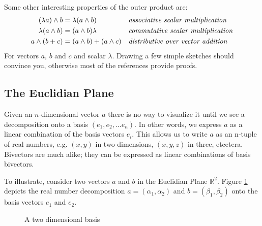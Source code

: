 \documentclass[10pt]{report}
\begin{document}
Some other interesting properties of the outer product are:
\begin{align}
(\lambda a)\wedge b &= \lambda(a\wedge b)        && \text{\emph{associative scalar multiplication}}      \label{eq:outer prod linear with scalar} \\
\lambda (a\wedge b) &= (a\wedge b)\lambda        && \text{\emph{commutative scalar multiplication}} \label{eq:outer prod commutativity with scalar} \\
a\wedge (b+c)       &= (a\wedge b) + (a\wedge c) && \text{\emph{distributive over vector addition}} \label{eq:outer prod distributivity over add}
\end{align}
For vectors $a$, $b$ and $c$ and scalar $\lambda$. Drawing a few
simple sketches should convince you, otherwise most of the
references provide proofs.

\subsection{The Euclidian Plane}

Given an $n$-dimensional vector $a$ there is no way to visualize
it until we see a decomposition onto a basis $(e_1, e_2, ...
e_n)$. In other words, we express $a$ as a linear combination of
the basis vectors $e_i$. This allows us to write $a$ as an n-tuple
of real numbers, e.g. $(x, y)$ in two dimensions, $(x, y, z)$ in
three, etcetera. Bivectors are much alike; they can be expressed
as linear combinations of basis bivectors.

To illustrate, consider two vectors $a$ and $b$ in the Euclidian
Plane $\mathbb{R}^2$. Figure \ref{fig:2d_basis} depicts the real
number decomposition $a = (\alpha_{1}, \alpha_{2})$ and $b =
(\beta_{1}, \beta_{2})$ onto the basis vectors $e_1$ and $e_2$.

\begin{figure}[ht]
\centering

\caption{A two dimensional basis} \label{fig:2d_basis}
\end{figure}
\end{document}
